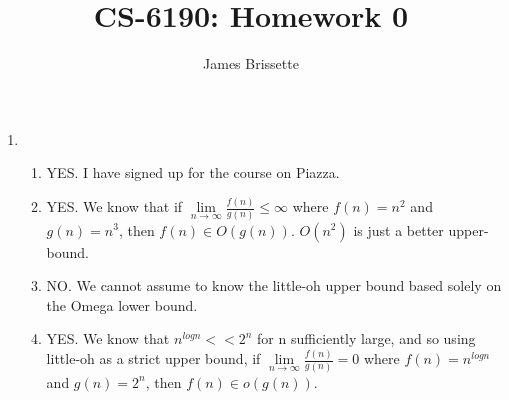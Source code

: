 \documentclass[11pt,a4paper]{article}
\author{James Brissette}
\title{CS-6190: Homework 0}
\begin{document}
	\maketitle
	
	\begin{enumerate}
		\item
		\begin{enumerate}
			\item YES. I have signed up for the course on Piazza.
			\item YES. We know that if $\lim\limits_{n \rightarrow \infty} \frac{f(n)}{g(n)} \leq \infty$ where $f(n) = n^2$ and $g(n) = n^3$, then $f(n) \in O(g(n))$. $O(n^2)$ is just a better upper-bound.
			\item NO. We cannot assume to know the little-oh upper bound based solely on the Omega lower bound. 
			\item YES. We know that $n^{log n} << 2^n$ for n sufficiently large, and so using little-oh as a strict upper bound, if $\lim\limits_{n \rightarrow \infty}\frac{f(n)}{g(n)}=0$ where $f(n) = n^{log n}$ and $g(n) = 2^n$, then $f(n) \in o(g(n))$.
		\end{enumerate}
		

\end{enumerate}
\end{document}
